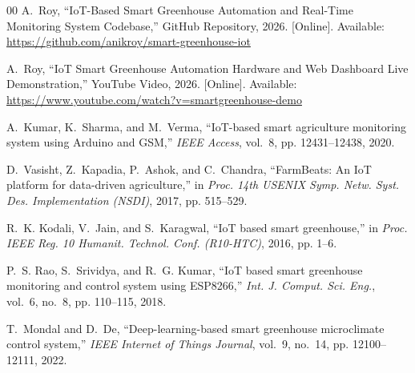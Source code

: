 \documentclass[conference]{IEEEtran}
\begin{document}
\begin{thebibliography}{00}
A.~Roy, ``IoT-Based Smart Greenhouse Automation and Real-Time Monitoring System Codebase,'' GitHub Repository, 2026. [Online]. Available: \url{https://github.com/anikroy/smart-greenhouse-iot}

A.~Roy, ``IoT Smart Greenhouse Automation Hardware and Web Dashboard Live Demonstration,'' YouTube Video, 2026. [Online]. Available: \url{https://www.youtube.com/watch?v=smartgreenhouse-demo}

A.~Kumar, K.~Sharma, and M.~Verma, ``IoT-based smart agriculture monitoring system using Arduino and GSM,'' \emph{IEEE Access}, vol.~8, pp. 12431--12438, 2020.

D.~Vasisht, Z.~Kapadia, P.~Ashok, and C.~Chandra, ``FarmBeats: An IoT platform for data-driven agriculture,'' in \emph{Proc. 14th USENIX Symp. Netw. Syst. Des. Implementation (NSDI)}, 2017, pp. 515--529.

R.~K. Kodali, V.~Jain, and S.~Karagwal, ``IoT based smart greenhouse,'' in \emph{Proc. IEEE Reg. 10 Humanit. Technol. Conf. (R10-HTC)}, 2016, pp. 1--6.

P.~S. Rao, S.~Srividya, and R.~G. Kumar, ``IoT based smart greenhouse monitoring and control system using ESP8266,'' \emph{Int. J. Comput. Sci. Eng.}, vol.~6, no.~8, pp. 110--115, 2018.

T.~Mondal and D.~De, ``Deep-learning-based smart greenhouse microclimate control system,'' \emph{IEEE Internet of Things Journal}, vol.~9, no.~14, pp. 12100--12111, 2022.
\end{thebibliography}
\end{document}
